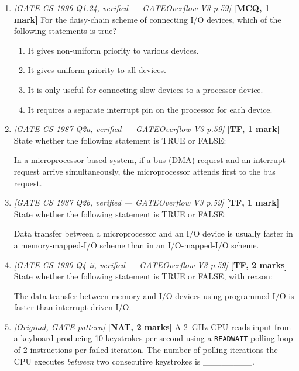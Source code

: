 \documentclass[11pt]{article}
\begin{document}
\begin{enumerate}
\item[\textbf{Q4}] \textit{[GATE CS 1996 Q1.24, verified --- GATEOverflow V3 p.59]} \textbf{[MCQ, 1 mark]} For the daisy-chain scheme of connecting I/O devices, which of the following statements is true?
\begin{enumerate}
  \item[(A)] It gives non-uniform priority to various devices.
  \item[(B)] It gives uniform priority to all devices.
  \item[(C)] It is only useful for connecting slow devices to a processor device.
  \item[(D)] It requires a separate interrupt pin on the processor for each device.
\end{enumerate}

\item[\textbf{Q5}] \textit{[GATE CS 1987 Q2a, verified --- GATEOverflow V3 p.59]} \textbf{[TF, 1 mark]} State whether the following statement is TRUE or FALSE:

In a microprocessor-based system, if a bus (DMA) request and an interrupt request arrive simultaneously, the microprocessor attends first to the bus request.

\item[\textbf{Q6}] \textit{[GATE CS 1987 Q2b, verified --- GATEOverflow V3 p.59]} \textbf{[TF, 1 mark]} State whether the following statement is TRUE or FALSE:

Data transfer between a microprocessor and an I/O device is usually faster in a memory-mapped-I/O scheme than in an I/O-mapped-I/O scheme.

\item[\textbf{Q7}] \textit{[GATE CS 1990 Q4-ii, verified --- GATEOverflow V3 p.59]} \textbf{[TF, 2 marks]} State whether the following statement is TRUE or FALSE, with reason:

The data transfer between memory and I/O devices using programmed I/O is faster than interrupt-driven I/O.

\item[\textbf{Q8}] \textit{[Original, GATE-pattern]} \textbf{[NAT, 2 marks]} A 2~GHz CPU reads input from a keyboard producing 10 keystrokes per second using a \texttt{READWAIT} polling loop of 2 instructions per failed iteration. The number of polling iterations the CPU executes \emph{between} two consecutive keystrokes is \_\_\_\_\_\_\_\_.


\end{enumerate}
\end{document}
